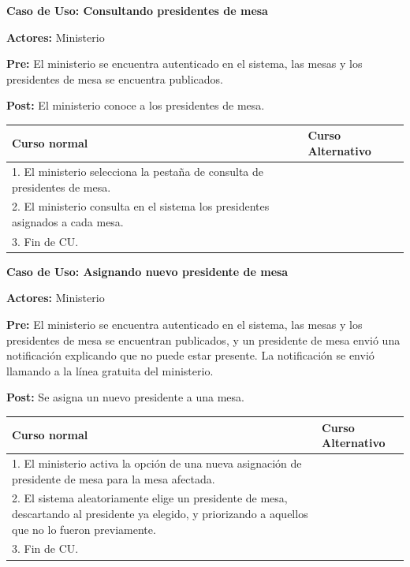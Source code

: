 \textbf{Caso de Uso: Consultando presidentes de mesa}

\textbf{Actores:} Ministerio 

\textbf{Pre:} El ministerio se encuentra autenticado en el sistema, las mesas y los presidentes de mesa se encuentra publicados.

\textbf{Post:} El ministerio conoce a los presidentes de mesa.
\begin{table}[h!]
	
 \begin{tabular}{|p{7.5cm} | p{7.5cm}|} 
 \hline
 \textbf{Curso normal} & \textbf{Curso Alternativo} \\
 \hline

1. El ministerio selecciona la pestaña de consulta de presidentes de mesa. & \\
\hline
2. El ministerio consulta en el sistema los presidentes asignados a cada mesa. & \\
\hline
3. Fin de CU. & \\
\hline
 \end{tabular}

\end{table}

\textbf{Caso de Uso: Asignando nuevo presidente de mesa}

\textbf{Actores:} Ministerio 

\textbf{Pre:} El ministerio se encuentra autenticado en el sistema, las mesas y los presidentes de mesa se encuentran publicados, y un presidente de mesa envió una notificación explicando que no puede estar presente. La notificación se envió llamando a la línea gratuita del ministerio.

\textbf{Post:} Se asigna un nuevo presidente a una mesa.
\begin{table}[h!]
	
 \begin{tabular}{|p{7.5cm} | p{7.5cm}|} 
 \hline
 \textbf{Curso normal} & \textbf{Curso Alternativo} \\
 \hline

1. El ministerio activa la opción de una nueva asignación de presidente de mesa para la mesa afectada. & \\
\hline

2.  El sistema aleatoriamente elige un presidente de mesa, descartando al presidente ya elegido, y priorizando a aquellos que no lo fueron previamente. & \\
\hline


3. Fin de CU. & \\
\hline



 \end{tabular}

\end{table}


